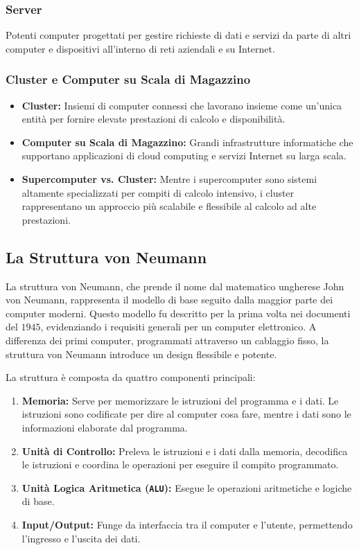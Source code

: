 \subsubsection{Server}
Potenti computer progettati per gestire richieste di dati e servizi da parte di altri computer e dispositivi all'interno di reti aziendali e su Internet.

\subsubsection{Cluster e Computer su Scala di Magazzino}
\begin{itemize}
    \item \textbf{Cluster:} Insiemi di computer connessi che lavorano insieme come un'unica entità per fornire elevate prestazioni di calcolo e disponibilità.
    \item \textbf{Computer su Scala di Magazzino:} Grandi infrastrutture informatiche che supportano applicazioni di cloud computing e servizi Internet su larga scala.
    \item \textbf{Supercomputer vs. Cluster:} Mentre i supercomputer sono sistemi altamente specializzati per compiti di calcolo intensivo, i cluster rappresentano un approccio più scalabile e flessibile al calcolo ad alte prestazioni.
\end{itemize}

\subsection{La Struttura von Neumann}

La struttura von Neumann, che prende il nome dal matematico
ungherese John von Neumann, rappresenta il modello di base seguito
dalla maggior parte dei computer moderni. Questo modello fu descritto
per la prima volta nei documenti del $1945$, evidenziando i requisiti
generali per un computer elettronico. A differenza dei primi computer,
programmati attraverso un cablaggio fisso, la struttura von Neumann
introduce un design flessibile e potente.

La struttura è composta da quattro componenti principali:

\begin{enumerate}
    \item \textbf{Memoria:} Serve per memorizzare le istruzioni del programma
    e i dati. Le istruzioni sono codificate per dire al computer cosa fare,
    mentre i dati sono le informazioni elaborate dal programma.
    \item \textbf{Unità di Controllo:} Preleva le istruzioni e i dati dalla
    memoria, decodifica le istruzioni e coordina le operazioni per eseguire
    il compito programmato.
    \item \textbf{Unità Logica Aritmetica (\texttt{ALU}):} Esegue le operazioni
    aritmetiche
    e logiche di base.
    \item \textbf{Input/Output:} Funge da interfaccia tra il computer e l'utente,
    permettendo l'ingresso e l'uscita dei dati.
\end{enumerate}

